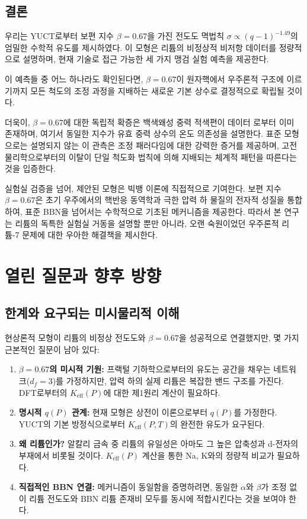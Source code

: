 \documentclass[11pt,a4paper]{article}
\newcommand{\Ke}{K_{\mathrm{eff}}}
\newcommand{\df}{d_{\!f}}
\newcommand{\alp}{\alpha}
\theoremstyle{remark}
\begin{document}
	\subsection{결론}
	
	우리는 YUCT로부터 보편 지수 \(\beta = 0.67\)을 가진 전도도 멱법칙 \(\sigma \propto (q-1)^{-1.49}\)의 엄밀한 수학적 유도를 제시하였다. 이 모형은 리튬의 비정상적 비저항 데이터를 정량적으로 설명하며, 현재 기술로 접근 가능한 세 가지 맹검 실험 예측을 제공한다.
	
	이 예측들 중 어느 하나라도 확인된다면, \(\beta = 0.67\)이 원자핵에서 우주론적 구조에 이르기까지 모든 척도의 조정 과정을 지배하는 새로운 기본 상수로 결정적으로 확립될 것이다.
	
	더욱이, \(\beta = 0.67\)에 대한 독립적 확증은 백색왜성 중력 적색편이 데이터 \cite{Crumpler2024}로부터 이미 존재하며, 여기서 동일한 지수가 유효 중력 상수의 온도 의존성을 설명한다. 표준 모형으로는 설명되지 않는 이 관측은 조정 패러다임에 대한 강력한 증거를 제공하며, 고전 물리학으로부터의 이탈이 단일 척도화 법칙에 의해 지배되는 체계적 패턴을 따른다는 것을 입증한다.
	
	실험실 검증을 넘어, 제안된 모형은 빅뱅 이론에 직접적으로 기여한다. 보편 지수 \(\beta = 0.67\)은 초기 우주에서의 핵반응 동역학과 극한 압력 하 물질의 전자적 성질을 통합하여, 표준 BBN을 넘어서는 수학적으로 기초된 메커니즘을 제공한다. 따라서 본 연구는 리튬의 독특한 실험실 거동을 설명할 뿐만 아니라, 오랜 숙원이었던 우주론적 리튬-7 문제에 대한 우아한 해결책을 제시한다.
	
	\section{열린 질문과 향후 방향}
	\label{sec:open-questions}
	
	\subsection{한계와 요구되는 미시물리적 이해}
	
	현상론적 모형이 리튬의 비정상 전도도와 \(\beta = 0.67\)을 성공적으로 연결했지만, 몇 가지 근본적인 질문이 남아 있다:
	
	\begin{enumerate}
		\item \textbf{\(\beta = 0.67\)의 미시적 기원:} 프랙털 기하학으로부터의 유도는 공간을 채우는 네트워크(\(\df = 3\))를 가정하지만, 압력 하의 실제 리튬은 복잡한 밴드 구조를 가진다. DFT로부터의 \(\Ke(P)\)에 대한 제1원리 계산이 필요하다.
		\item \textbf{명시적 \(q(P)\) 관계:} 현재 모형은 상전이 이론으로부터 \(q(P)\)를 가정한다. YUCT의 기본 방정식으로부터 \(\Ke(P,T)\)의 완전한 유도가 요구된다.
		\item \textbf{왜 리튬인가?} 알칼리 금속 중 리튬의 유일성은 아마도 그 높은 압축성과 d-전자의 부재에서 비롯될 것이다. \(\Ke(P)\) 계산을 통한 Na, K와의 정량적 비교가 필요하다.
		\item \textbf{직접적인 BBN 연결:} 메커니즘이 동일함을 증명하려면, 동일한 \(\alp\)와 \(\beta\)가 조정 없이 리튬 전도도와 BBN 리튬 존재비 모두를 동시에 적합시킨다는 것을 보여야 한다.
	\end{enumerate}
	
\end{document}
